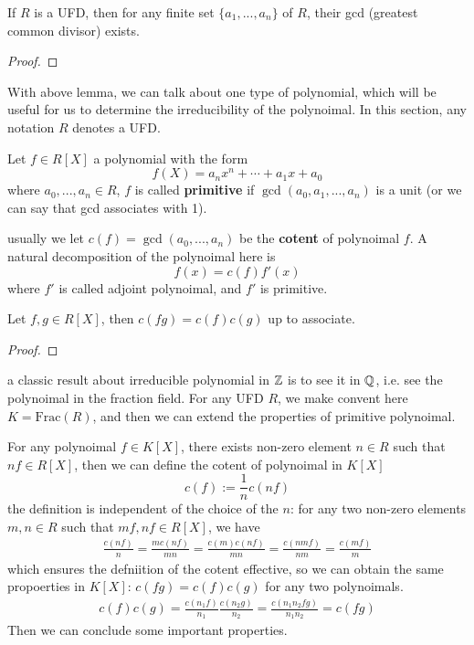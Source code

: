 \documentclass[en,geye,blue,normal,12pt]{elegantnote}
\begin{document}
\begin{lemma}
  If \(R\) is a UFD, then for any finite set \(\{a_1,...,a_n\}\) of \(R\), their gcd (greatest common divisor) exists.

  \begin{proof}
    
  \end{proof}
\end{lemma}
With above lemma, we can talk about one type of polynomial, which will be useful for us to determine the irreducibility of the polynoimal. In this section, any notation \(R\) denotes a UFD.

\begin{definition}
  Let \(f \in R[X]\) a polynomial with the form
  \[f(X) = a_nx^n+\cdots +a_1x+a_0\]
  where \(a_0,...,a_n \in R\), \(f\) is called \textbf{primitive} if \(\gcd(a_0,a_1,...,a_n)\) is a unit (or we can say that gcd associates with 1).
\end{definition}

usually we let \(c(f) = \gcd (a_0,...,a_n)\) be the \textbf{cotent} of polynoimal \(f\). A natural decomposition of the polynoimal here is
\[f(x) = c(f)f'(x)\]
where \(f'\) is called adjoint polynoimal, and \(f'\) is primitive.

\begin{proposition} \label{c(fg) = c(f)c(g)}
  Let \(f,g \in R[X]\), then \(c(fg) = c(f)c(g)\) up to associate.

  \begin{proof}
    
  \end{proof}
\end{proposition}

a classic result about irreducible polynomial in \(\mathbb{Z}\) is to see it in \(\mathbb{Q}\), i.e. see the polynoimal in the fraction field. For any UFD \(R\), we make convent here \(K=\text{Frac}(R)\), and then we can extend the properties of primitive polynoimal.

For any polynoimal \(f \in K[X]\), there exists non-zero element \(n \in R\) such that \(nf \in R[X]\), then we can define the cotent of polynoimal in \(K[X]\)
\[c(f) := \frac{1}{n}c(nf)\]
the definition is independent of the choice of the \(n\): for any two non-zero elements \(m,n \in R\) such that \(mf,nf \in R[X]\), we have
\begin{align*}
  \frac{c(nf)}{n} = \frac{mc(nf)}{mn} = \frac{c(m)c(nf)}{mn} = \frac{c(nmf)}{nm} = \frac{c(mf)}{m}
\end{align*}
which ensures the defniition of the cotent effective, so we can obtain the same propoerties in \(K[X]\): \(c(fg) = c(f)c(g)\) for any two polynoimals.
\begin{align*}
  c(f)c(g) = \frac{c(n_1f)}{n_1} \frac{c(n_2g)}{n_2} = \frac{c(n_1n_2fg)}{n_1n_2} = c(fg)
\end{align*}
Then we can conclude some important properties.
\end{document}

